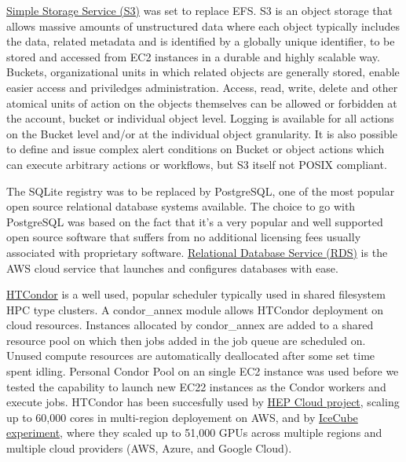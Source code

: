 \href{https://aws.amazon.com/s3/}{Simple Storage Service (S3)} was set to replace EFS. S3 is an object storage that allows massive amounts of unstructured data where each object typically includes the data, related metadata and is identified by a globally unique identifier, to be stored and accessed from EC2 instances in a durable and highly scalable way.\newline
Buckets, organizational units in which related objects are generally stored, enable easier access and priviledges administration. Access, read, write, delete and other atomical units of action on the objects themselves can be allowed or forbidden at the account, bucket or individual object level. Logging is available for all actions on the Bucket level and/or at the individual object granularity. It is also possible to define and issue complex alert conditions on Bucket or object actions which can execute arbitrary actions or workflows, but S3 itself not POSIX compliant. 

The SQLite registry was to be replaced by PostgreSQL, one of the most popular open source relational database systems available. The choice to go with PostgreSQL was based on the fact that it's a very popular and well supported open source software that suffers from no additional licensing fees usually associated with proprietary software. \href{https://aws.amazon.com/rds/}{Relational Database Service (RDS)} is the AWS cloud service that launches and configures databases with ease. 

\href{https://research.cs.wisc.edu/htcondor}{HTCondor} is a well used, popular scheduler typically used in shared filesystem HPC type clusters. A condor\_annex module allows HTCondor deployment on cloud resources. Instances allocated by condor\_annex are added to a shared resource pool on which then jobs added in the job queue are scheduled on. Unused compute resources are automatically deallocated after some set time spent idling. Personal Condor Pool on an single EC2 instance was used before we tested the capability to launch new EC22 instances as the Condor workers and execute jobs. HTCondor has been succesfully used by \href{https://aws.amazon.com/blogs/aws/experiment-that-discovered-the-higgs-boson-uses-aws-to-probe-nature}{HEP Cloud project}, scaling up to 60,000 cores in multi-region deployement on AWS, and by \href{https://www.linkedin.com/pulse/using-50k-gpus-across-multiple-clouds-icecube-science-igor-sfiligoi}{IceCube experiment}, where they scaled up to 51,000 GPUs across multiple regions and multiple cloud providers (AWS, Azure, and Google Cloud).

